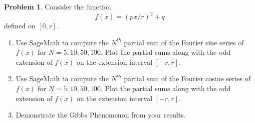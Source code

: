 \documentclass[10pt]{article}
\theoremstyle{definition}
\newtheorem{problem}{Problem}
\begin{document}
\begin{problem}
Consider the function
$$
  f(x)=\left(px/r\right)^2+q
$$
defined on $\left[0,r\right]$.

\begin{enumerate}[label=(\alph*)]
  \item Use SageMath to compute the $N^{th}$ partial sum of the Fourier sine series of $f(x)$
        for $N=5,10,50,100$. Plot the partial sums along with the odd extension of $f(x)$
        on the extension interval $\left[-r,r\right]$.
  \item Use SageMath to compute the $N^{th}$ partial sum of the Fourier cosine series of $f(x)$
        for $N=5,10,50,100$. Plot the partial sums along with the odd extension of $f(x)$
        on the extension interval $\left[-r,r\right]$.
  \item Demonstrate the Gibbs Phenomenon from your results.
\end{enumerate}
\end{problem}
\end{document}
